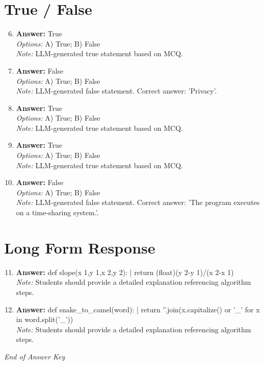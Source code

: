 \documentclass[12pt]{article}
\begin{document}
\section*{True / False}
\begin{enumerate}[label=\arabic*.]
\setcounter{enumi}{5}
\item \textbf{Answer:} True
\\ \textit{Options:} A) True; B) False
\\ \textit{Note:} LLM-generated true statement based on MCQ.
\item \textbf{Answer:} False
\\ \textit{Options:} A) True; B) False
\\ \textit{Note:} LLM-generated false statement. Correct answer: 'Privacy'.
\item \textbf{Answer:} True
\\ \textit{Options:} A) True; B) False
\\ \textit{Note:} LLM-generated true statement based on MCQ.
\item \textbf{Answer:} True
\\ \textit{Options:} A) True; B) False
\\ \textit{Note:} LLM-generated true statement based on MCQ.
\item \textbf{Answer:} False
\\ \textit{Options:} A) True; B) False
\\ \textit{Note:} LLM-generated false statement. Correct answer: 'The program executes on a time-sharing system.'.
\end{enumerate}

\section*{Long Form Response}
\begin{enumerate}[label=\arabic*.]
\setcounter{enumi}{10}
\item \textbf{Answer:} def slope(x 1,y 1,x 2,y 2): | return (float)(y 2-y 1)/(x 2-x 1)
\\ \textit{Note:} Students should provide a detailed explanation referencing algorithm steps.
\item \textbf{Answer:} def snake\_to\_camel(word): | return ''.join(x.capitalize() or '\_' for x in word.split('\_'))
\\ \textit{Note:} Students should provide a detailed explanation referencing algorithm steps.
\end{enumerate}

\vfill
\noindent\textit{End of Answer Key}
\end{document}
